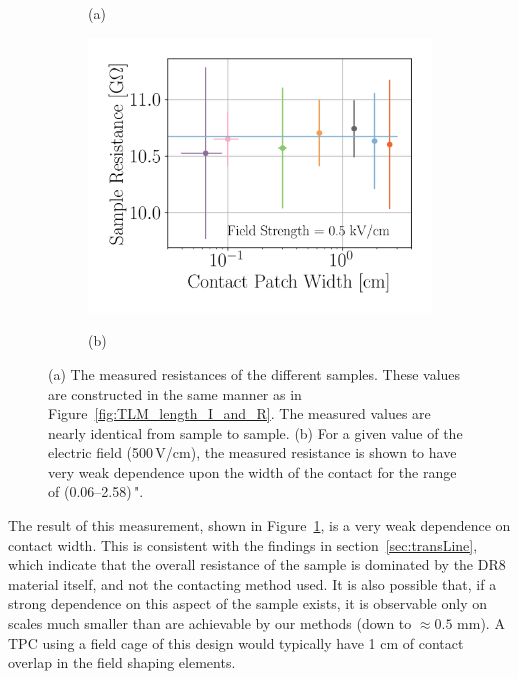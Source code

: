 \documentclass[a4paper,12pt]{article}
\newcommand{\DR}{DR8}
\begin{document}
\begin{figure}[htb]
\begin{subfigure}[c]{0.32\textheight}
\begin{center}
		\vspace*{-\baselineskip} \hspace{1em} (a)
	\end{center}
\end{subfigure}
\begin{subfigure}[c]{0.32\textheight}
	\begin{center}
		\includegraphics[width=\textwidth]{TLM_contact_fit.png}
		
		\vspace*{-\baselineskip} \hspace{2em} (b)
	\end{center}
\end{subfigure}
\caption{(a) The measured resistances of the different samples.  These values are constructed in the same manner as in Figure~\ref{fig:TLM_length_I_and_R}.  The measured values are nearly identical from sample to sample. (b) For a given value of the electric field (500\,V/cm), the measured resistance is shown to have very weak dependence upon the width of the contact for the range of (0.06--2.58)\,".} 
\label{fig:TLM_contact_contactRes}
\end{figure}

The result of this measurement, shown in Figure~\ref{fig:TLM_contact_contactRes}, is a very weak dependence on contact width.  This is consistent with the findings in section~\ref{sec:transLine}, which indicate that the overall resistance of the sample is dominated by the {\DR} material itself, and not the contacting method used.  It is also possible that, if a strong dependence on this aspect of the sample exists, it is observable only on scales much smaller than are achievable by our methods (down to $\approx 0.5$ mm).  A TPC using a field cage of this design would typically have 1 cm of contact overlap in the field shaping elements.
\end{document}
